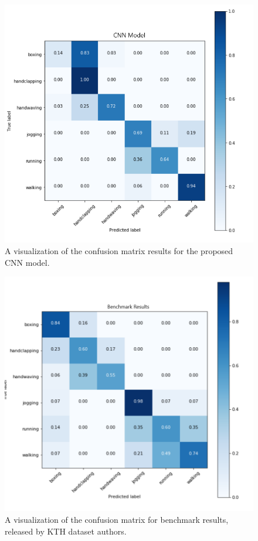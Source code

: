 \begin{figure}[ht]
\centering
\includegraphics[width=1.0\columnwidth]{Figures/benchmarkresult.png}
\decoRule
\caption[A visualization of the confusion matrix results for the proposed CNN model.]{A visualization of the confusion matrix results for the proposed CNN model.}
\label{fig:cmcnn}
\end{figure}


\begin{figure}[ht]
\centering
\includegraphics[width=1.0\columnwidth]{Figures/bm.png}
\decoRule
\caption[A visualization of the confusion matrix for benchmark results, released by KTH dataset authors.]{A visualization of the confusion matrix for benchmark results, released by KTH dataset authors.}
\label{fig:cmbm}
\end{figure}

